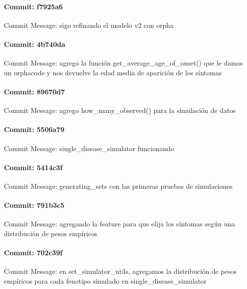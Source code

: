 \documentclass{article}
\begin{document}
\paragraph{Commit: f7925a6}
Commit Message: sigo refinando el modelo v2 con orpha

\paragraph{Commit: 4b740da}
Commit Message: agrego la función get_average_age_of_onset() que le damos un orphacode y nos devuelve la edad media de aparición de los síntomas

\paragraph{Commit: 89670d7}
Commit Message: agrego how_many_observed() para la simulación de datos

\paragraph{Commit: 5506a79}
Commit Message: single_disease_simulator funcionando

\paragraph{Commit: 5414c3f}
Commit Message: generating_sets con las primeras pruebas de simulaciones

\paragraph{Commit: 791b3c5}
Commit Message: agregando la feature para que elija los síntomas según una distribución de pesos empíricos

\paragraph{Commit: 702c39f}
Commit Message: en set_simulator_utils, agregamos la distribución de pesos empíricos para cada fenotipo simulado en single_disease_simulator

\end{document}
